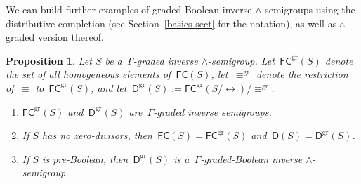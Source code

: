 \documentclass[a4paper,reqno,12pt]{amsart}
\numberwithin{equation}{section}
\theoremstyle{plain}
\newtheorem{prop}[thm]{Proposition}
\theoremstyle{definition}
\newcommand{\gr}{\operatorname{gr}}
\begin{document}
We can build further examples of graded-Boolean inverse $\land$-semigroups using the distributive completion (see Section~\ref{basics-sect} for the notation), as well as a graded version thereof.

\begin{prop} \label{distr-comp}
Let $S$ be a $\, \Gamma$-graded inverse $\land$-semigroup. Let $\, \mathsf{FC}^{\gr}(S)$ denote the set of all homogeneous elements of $\, \mathsf{FC}(S)$, let $\, \equiv^{\gr}$ denote the restriction of $\, \equiv$ to $\, \mathsf{FC}^{\gr}(S)$, and let $\, \mathsf{D}^{\gr}(S) := \mathsf{FC}^{\gr}(S/\leftrightarrow)/\equiv^{\gr}$.

\begin{enumerate}[\upshape(1)]
\item $\mathsf{FC}^{\gr}(S)$ and $\, \mathsf{D}^{\gr}(S)$ are $\, \Gamma$-graded inverse semigroups.

\smallskip 

\item If $S$ has no zero-divisors, then $\, \mathsf{FC}(S) = \mathsf{FC}^{\gr}(S)$ and $\, \mathsf{D}(S) = \mathsf{D}^{\gr}(S)$.

\smallskip 

\item If $S$ is pre-Boolean, then $\, \mathsf{D}^{\gr}(S)$ is a $\, \Gamma$-graded-Boolean inverse $\land$-semigroup.
\end{enumerate}
\end{prop}
\end{document}
